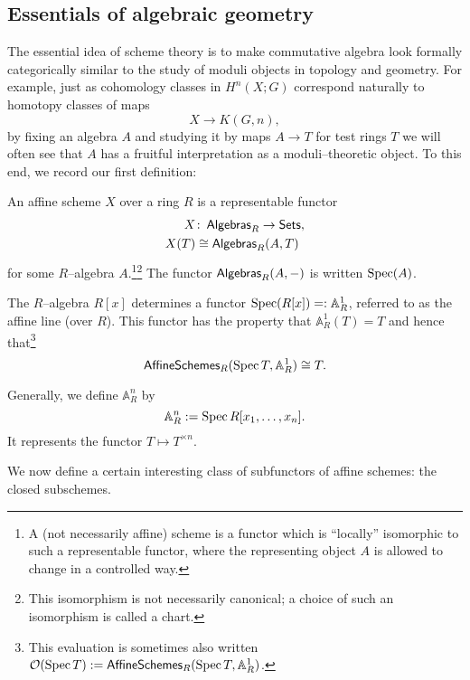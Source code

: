 \subsection*{Essentials of algebraic geometry}

The essential idea of scheme theory is to make commutative algebra look formally categorically similar to the study of moduli objects in topology and geometry.  For example, just as cohomology classes in $H^n(X; G)$ correspond naturally to homotopy classes of maps \[X \to K(G, n),\] by fixing an algebra $A$ and studying it by maps $A \to T$ for test rings $T$ we will often see that $A$ has a fruitful interpretation as a moduli--theoretic object.  To this end, we record our first definition:

\begin{definition}\label{AffineScheme}
An affine scheme $X$ over a ring $R$ is a representable functor
\begin{align*}
X & \colon\thinspace \mathsf{Algebras}_R \to \mathsf{Sets}, \\
X(T) & \cong \mathsf{Algebras}_R(A, T)
\end{align*}
for some $R$--algebra $A$.\footnote{A (not necessarily affine) scheme is a functor which is ``locally'' isomorphic to such a representable functor, where the representing object $A$ is allowed to change in a controlled way.}\footnote{This isomorphism is not necessarily canonical; a choice of such an isomorphism is called a chart.}  The functor $\mathsf{Algebras}_R(A, -)$ is written $\operatorname{Spec}(A)$.
\end{definition}

\begin{example}\label{A1Example}
The $R$--algebra $R[x]$ determines a functor $\operatorname{Spec}(R[x]) =: \mathbb A^1_R$, referred to as the affine line (over $R$).  This functor has the property that $\mathbb A^1_R(T) = T$ and hence that\footnote{This evaluation is sometimes also written $\mathcal{O}(\operatorname{Spec} T) := \mathsf{AffineSchemes}_R(\operatorname{Spec} T, \mathbb A^1_R)$.} \[\mathsf{AffineSchemes}_R(\operatorname{Spec} T, \mathbb A^1_R) \cong T.\]
\end{example}

\begin{example}
Generally, we define $\mathbb A^n_R$ by \[\mathbb A^n_R := \operatorname{Spec} R[x_1, \ldots, x_n].\]  It represents the functor $T \mapsto T^{\times n}$.
\end{example}

We now define a certain interesting class of subfunctors of affine schemes: the closed subschemes.

